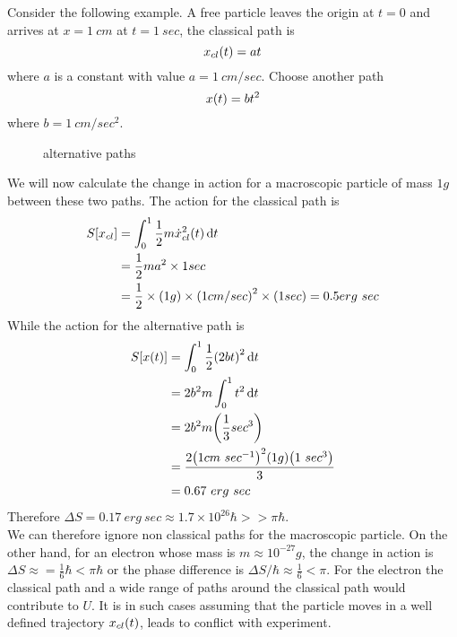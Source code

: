 	
	Consider the following example. A free particle leaves the origin at $t=0$ and arrives at $x=1\ cm$ at $t= 1 \ sec$, the classical path is 
	\begin{equation}
		x_{cl}\qty(t) = a t
	\end{equation}
	where $a$ is a constant with value $a=1\ cm/sec$. Choose another path
	\begin{equation}
		x\qty(t) = b t^2
	\end{equation}
	where $b= 1\ cm/sec^2$.
	
	
	\begin{figure}
		\caption{alternative paths}
	\end{figure}

	We will now calculate the change in action for a macroscopic particle of mass $1 g$ between these two paths. The action for the classical path is
	\begin{align*}
		S\qty[x_{cl}] 
		&= \int_{0}^{1} \frac{1}{2} m \dot{x}_{cl}^2\qty(t) \dd{t} \\
		&= \frac{1}{2} m a^2 \times 1 sec \\
		&= \frac{1}{2} \times \qty(1 g) \times \qty(1 cm/sec)^2 \times (1 sec) = 0.5 erg\ sec
	\end{align*}
	While the action for the alternative path is 
	\begin{align*}
		S\qty[x\qty(t)] 
		&=\int_{0}^{1}\frac{1}{2} \qty(2 b t)^2 \dd{t} \\
		&= 2 b^2 m \int_{0}^{1} t^2 \dd{t}\\
		&= 2 b^2 m \qty(\frac{1}{3} sec^3) \\
		&= \frac{2 \qty(1 cm\ {sec}^{-1})^2 \qty(1 g)\qty(1\ sec^3)}{3} \\
		&= 0.67\ erg \ sec
	\end{align*}
	Therefore $\Delta S = 0.17 \ erg\ sec \approx 1.7 \times 10^{26} \hbar >> \pi \hbar$.\\
	We can therefore ignore non classical paths for the macroscopic particle. On the other hand, for an electron whose mass is $m \approx 10^{-27} g$, the change in action is $\Delta S \approx = \frac{1}{6} \hbar < \pi \hbar$ or the phase difference is $\Delta S/\hbar \approx \frac{1}{6} < \pi$. For the electron the classical path and a wide range of paths around the classical path would contribute to $U$. It is in such cases assuming that the particle moves in a well defined trajectory $x_{cl}\qty(t)$, leads to conflict with experiment.
	
		
		

